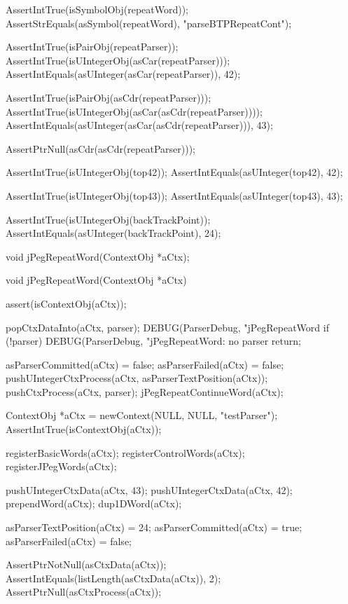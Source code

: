   AssertIntTrue(isSymbolObj(repeatWord));
  AssertStrEquals(asSymbol(repeatWord), "parseBTPRepeatCont");
  
  AssertIntTrue(isPairObj(repeatParser));
  AssertIntTrue(isUIntegerObj(asCar(repeatParser)));
  AssertIntEquals(asUInteger(asCar(repeatParser)), 42);
  
  AssertIntTrue(isPairObj(asCdr(repeatParser)));
  AssertIntTrue(isUIntegerObj(asCar(asCdr(repeatParser))));
  AssertIntEquals(asUInteger(asCar(asCdr(repeatParser))), 43);
  
  AssertPtrNull(asCdr(asCdr(repeatParser)));
  
  AssertIntTrue(isUIntegerObj(top42));
  AssertIntEquals(asUInteger(top42), 42);  

  AssertIntTrue(isUIntegerObj(top43));
  AssertIntEquals(asUInteger(top43), 43);
  
  AssertIntTrue(isUIntegerObj(backTrackPoint));
  AssertIntEquals(asUInteger(backTrackPoint), 24);
\stopCTest
\stopTestCase
\stopTestSuite

\startTestSuite[jPegRepeatWord]

\startCHeader
void jPegRepeatWord(ContextObj *aCtx);
\stopCHeader

\startCCode
void jPegRepeatWord(ContextObj *aCtx) {
  assert(isContextObj(aCtx));
  
  popCtxDataInto(aCtx, parser);
  DEBUG(ParserDebug, "jPegRepeatWord%
  if (!parser) {
    DEBUG(ParserDebug, "jPegRepeatWord: no parser%
    return;
  }
  
  asParserCommitted(aCtx) = false;
  asParserFailed(aCtx)    = false;
  pushUIntegerCtxProcess(aCtx, asParserTextPosition(aCtx));
  pushCtxProcess(aCtx, parser);
  jPegRepeatContinueWord(aCtx);
}
\stopCCode


\startCTest
  ContextObj *aCtx = newContext(NULL, NULL, "testParser");
  AssertIntTrue(isContextObj(aCtx));
  
  registerBasicWords(aCtx);
  registerControlWords(aCtx);
  registerJPegWords(aCtx);
  
  pushUIntegerCtxData(aCtx, 43);
  pushUIntegerCtxData(aCtx, 42);
  prependWord(aCtx);
  dup1DWord(aCtx);
  
  asParserTextPosition(aCtx) = 24;
  asParserCommitted(aCtx)    = true;
  asParserFailed(aCtx)       = false;
  
  AssertPtrNotNull(asCtxData(aCtx));
  AssertIntEquals(listLength(asCtxData(aCtx)), 2);
  AssertPtrNull(asCtxProcess(aCtx));
  
